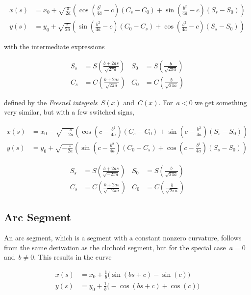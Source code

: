 \begin{align}
x(s) &= x_0 + \sqrt{\frac{\pi}{2a}}\left(\cos\left(\frac{b^2}{4a} - c\right)(C_s - C_0) + \sin\left(\frac{b^2}{4a} - c\right)(S_s - S_0)\right) \\
y(s) &= y_0 + \sqrt{\frac{\pi}{2a}}\left(\sin\left(\frac{b^2}{4a} - c\right)(C_0 - C_s) + \cos\left(\frac{b^2}{4a} - c\right)(S_s - S_0)\right)
\end{align}

with the intermediate expressions

\begin{align}
S_s &= S\left(\frac{b + 2as}{\sqrt{2\pi a}}\right) & S_0 &= S\left(\frac{b}{\sqrt{2\pi a}}\right) \\
C_s &= C\left(\frac{b + 2as}{\sqrt{2\pi a}}\right) & C_0 &= C\left(\frac{b}{\sqrt{2\pi a}}\right)
\end{align}

defined by the \textit{Fresnel integrals}~$S(x)$ and~$C(x)$.
For~$a < 0$ we get something very similar, but with a few switched signs,

\begin{align}
x(s) &= x_0 - \sqrt{-\frac{\pi}{2a}}\left(\cos\left(c - \frac{b^2}{4a}\right)(C_s - C_0) + \sin\left(c - \frac{b^2}{4a}\right)(S_s - S_0)\right) \\
y(s) &= y_0 + \sqrt{-\frac{\pi}{2a}}\left(\sin\left(c - \frac{b^2}{4a}\right)(C_0 - C_s) + \cos\left(c - \frac{b^2}{4a}\right)(S_s - S_0)\right)
\end{align}

\begin{align}
S_s &= S\left(\frac{b + 2as}{\sqrt{-2\pi a}}\right) & S_0 &= S\left(\frac{b}{\sqrt{2\pi a}}\right) \\
C_s &= C\left(\frac{b + 2as}{\sqrt{-2\pi a}}\right) & C_0 &= C\left(\frac{b}{\sqrt{2\pi a}}\right)
\end{align}

\subsection{Arc Segment}

An arc segment, which is a segment with a constant nonzero curvature, follows from the same derivation as the clothoid segment, but for the special case~$a = 0$ and~$b \neq 0$.
This results in the curve

\begin{align}
x(s) &= x_0 + \frac{1}{b}\bigg(\sin(bs + c) - \sin(c)\bigg) \\
y(s) &= y_0 + \frac{1}{b}\bigg(-\cos(bs + c) + \cos(c)\bigg)
\end{align}

